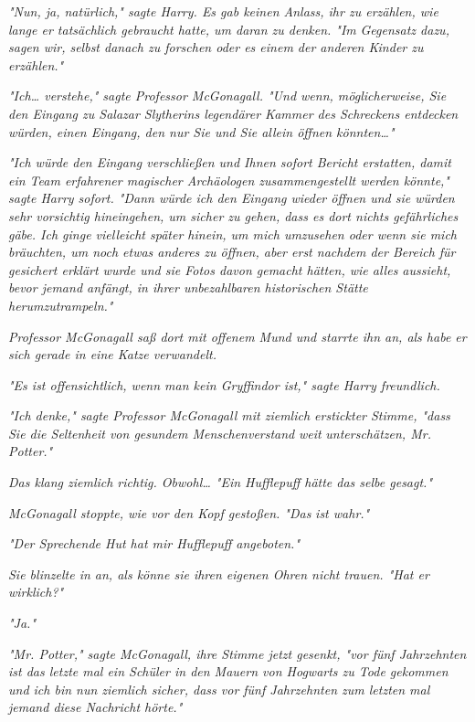 {\emph{"Nun, ja, natürlich," sagte Harry. Es gab keinen Anlass, ihr zu erzählen, wie lange er tatsächlich gebraucht hatte, um daran zu denken. "Im} \emph{Gegensatz dazu, sagen wir, selbst danach zu forschen oder es einem der anderen Kinder zu erzählen."}

\emph{"Ich… verstehe," sagte Professor McGonagall. "Und wenn, möglicherweise, Sie den Eingang zu Salazar Slytherins legendärer Kammer des Schreckens entdecken würden, einen Eingang, den nur Sie und Sie allein öffnen könnten…"}

\emph{"Ich würde den Eingang verschließen und Ihnen sofort Bericht erstatten, damit ein Team erfahrener magischer Archäologen zusammengestellt werden könnte," sagte Harry sofort. "Dann würde ich den Eingang wieder öffnen und sie würden sehr vorsichtig hineingehen, um sicher zu gehen, dass es dort nichts gefährliches gäbe. Ich ginge vielleicht später hinein, um mich umzusehen oder wenn sie mich bräuchten, um noch etwas anderes zu öffnen, aber erst nachdem der Bereich für gesichert erklärt wurde und sie Fotos davon gemacht hätten, wie alles aussieht, bevor jemand anfängt, in ihrer unbezahlbaren historischen Stätte herumzutrampeln."}

\emph{Professor McGonagall saß dort mit offenem Mund und starrte ihn an, als habe er sich gerade in eine Katze verwandelt.}

\emph{"Es ist offensichtlich, wenn man kein Gryffindor ist," sagte Harry freundlich.}

\emph{"Ich denke," sagte Professor McGonagall mit ziemlich erstickter Stimme, "dass Sie die Seltenheit von gesundem Menschenverstand} \emph{\emph{weit}} \emph{unterschätzen, Mr. Potter."}

\emph{Das klang ziemlich richtig. Obwohl… "Ein Hufflepuff hätte das selbe gesagt."}

\emph{McGonagall stoppte, wie vor den Kopf gestoßen. "\emph{Das}} \emph{ist wahr."}

\emph{"Der Sprechende Hut hat mir Hufflepuff angeboten."}

\emph{Sie blinzelte in an, als könne sie ihren eigenen Ohren nicht trauen. "Hat er} \emph{\emph{wirklich?}"}

\emph{"Ja."}

\emph{"Mr. Potter," sagte McGonagall, ihre Stimme jetzt gesenkt, "vor fünf Jahrzehnten ist das letzte mal ein Schüler in den Mauern von Hogwarts zu Tode gekommen und ich bin nun ziemlich sicher, dass vor fünf Jahrzehnten zum letzten mal jemand diese Nachricht hörte."}

}
